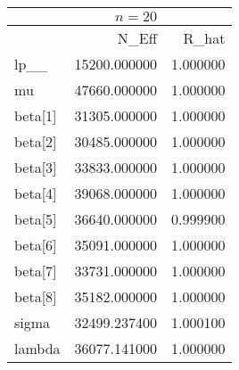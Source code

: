 \begin{tabular}{lrr}
& $ n = 20 $ & \\
\toprule
 & N\_Eff & R\_hat \\
\midrule
lp\_\_ & 15200.000000 & 1.000000 \\
mu & 47660.000000 & 1.000000 \\
beta[1] & 31305.000000 & 1.000000 \\
beta[2] & 30485.000000 & 1.000000 \\
beta[3] & 33833.000000 & 1.000000 \\
beta[4] & 39068.000000 & 1.000000 \\
beta[5] & 36640.000000 & 0.999900 \\
beta[6] & 35091.000000 & 1.000000 \\
beta[7] & 33731.000000 & 1.000000 \\
beta[8] & 35182.000000 & 1.000000 \\
sigma & 32499.237400 & 1.000100 \\
lambda & 36077.141000 & 1.000000 \\
\bottomrule
\end{tabular}
